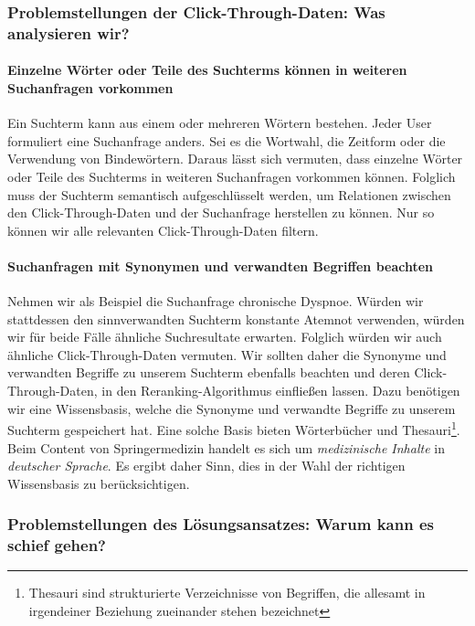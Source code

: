 \subsubsection{Problemstellungen der Click-Through-Daten: Was analysieren wir?}
\label{sec:Grundlagen:Grundbegriffe:SemantikUserInteraktionen:ProblemstellungenClick-Through-Daten}

\paragraph{Einzelne Wörter oder Teile des Suchterms können in weiteren Suchanfragen vorkommen}
Ein Suchterm kann aus einem oder mehreren Wörtern bestehen. Jeder User formuliert eine Suchanfrage anders. Sei es die Wortwahl, die Zeitform oder die Verwendung von Bindewörtern. Daraus lässt sich vermuten, dass einzelne Wörter oder Teile des Suchterms in weiteren Suchanfragen vorkommen können. Folglich muss der Suchterm semantisch aufgeschlüsselt werden, um Relationen zwischen den Click-Through-Daten und der Suchanfrage herstellen zu können. Nur so können wir alle relevanten Click-Through-Daten filtern.

\pagebreak

\paragraph{Suchanfragen mit Synonymen und verwandten Begriffen beachten}
Nehmen wir als Beispiel die Suchanfrage \glqq chronische Dyspnoe\grqq{}. Würden wir stattdessen den sinnverwandten Suchterm \glqq konstante Atemnot\grqq{} verwenden, würden wir für beide Fälle ähnliche Suchresultate erwarten. Folglich würden wir auch ähnliche Click-Through-Daten vermuten. Wir sollten daher die Synonyme und verwandten Begriffe zu unserem Suchterm ebenfalls beachten und deren Click-Through-Daten, in den Reranking-Algorithmus einfließen lassen. Dazu benötigen wir eine Wissensbasis, welche die Synonyme und verwandte Begriffe zu unserem Suchterm gespeichert hat. Eine solche Basis bieten Wörterbücher und Thesauri\footnote{Thesauri sind strukturierte Verzeichnisse von Begriffen, die allesamt in irgendeiner Beziehung zueinander stehen bezeichnet}. Beim Content von Springermedizin handelt es sich um \textit{medizinische Inhalte} in \textit{deutscher Sprache}. Es ergibt daher Sinn, dies in der Wahl der richtigen Wissensbasis zu berücksichtigen.

\subsubsection{Problemstellungen des Lösungsansatzes: Warum kann es schief gehen?}
\label{sec:Grundlagen:Grundbegriffe:SemantikUserInteraktionen:ProblemstellungenLoesungsansatz} 

